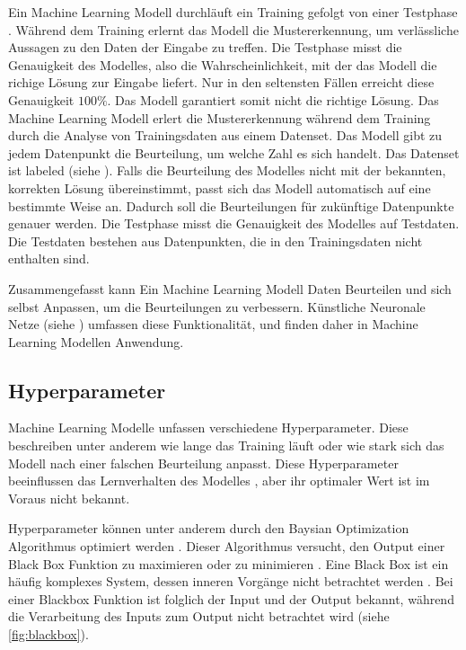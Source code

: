                 
Ein Machine Learning Modell durchläuft ein Training gefolgt von einer Testphase
\cite{noauthor_training_nodate}. Während dem Training erlernt das Modell die Mustererkennung,
um verlässliche Aussagen zu den Daten der Eingabe zu treffen. Die Testphase
misst die Genauigkeit des Modelles, also die Wahrscheinlichkeit, mit der das
Modell die richige Lösung zur Eingabe liefert. Nur in den seltensten Fällen
erreicht diese Genauigkeit $100\%$. Das Modell garantiert somit nicht die
richtige Lösung. Das Machine Learning Modell erlert die Mustererkennung während
dem Training durch die Analyse von Trainingsdaten aus einem Datenset. Das Modell
gibt zu jedem Datenpunkt die Beurteilung, um welche Zahl es sich handelt. Das
Datenset ist labeled (siehe ). Falls die Beurteilung des
Modelles nicht mit der bekannten, korrekten Lösung übereinstimmt, passt sich das
Modell automatisch auf eine bestimmte Weise an. Dadurch soll die Beurteilungen
für zukünftige Datenpunkte genauer werden. Die Testphase misst die Genauigkeit
des Modelles auf Testdaten. Die Testdaten bestehen aus Datenpunkten, die in den
Trainingsdaten nicht enthalten sind.

Zusammengefasst kann Ein Machine Learning Modell Daten Beurteilen und sich
selbst Anpassen, um die Beurteilungen zu verbessern. Künstliche Neuronale Netze
(siehe ) umfassen diese Funktionalität, und finden daher in
Machine Learning Modellen Anwendung.


\subsection{Hyperparameter}\label{sub:t_ml_hyper}
Machine Learning Modelle unfassen verschiedene Hyperparameter. Diese beschreiben
unter anderem wie lange das Training läuft oder wie stark sich das Modell nach
einer falschen Beurteilung anpasst. Diese Hyperparameter beeinflussen das
Lernverhalten des Modelles \cite{nyuytiymbiy_parameters_2022}, aber ihr optimaler Wert ist im
Voraus nicht bekannt.

Hyperparameter können unter anderem durch den Baysian Optimization Algorithmus
optimiert werden \cite{agnihotri_exploring_2020}\cite{paretos_bayesian_2021}.
Dieser Algorithmus versucht, den Output einer Black Box Funktion zu maximieren
oder zu minimieren \cite[S. 15]{garnett_bayesian_nodate}. Eine Black Box ist ein
häufig komplexes System, dessen inneren Vorgänge nicht betrachtet werden
\cite{noauthor_black_2021}. Bei einer Blackbox Funktion ist folglich der Input
und der Output bekannt, während die Verarbeitung des Inputs zum Output nicht
betrachtet wird (siehe \autoref{fig:blackbox}).

